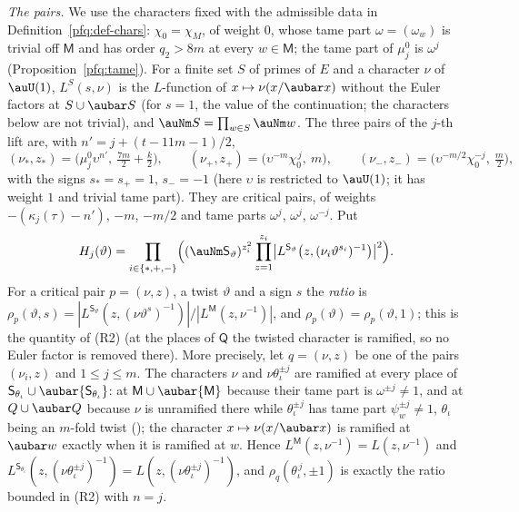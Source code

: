 \documentclass[10pt]{amsart}
\theoremstyle{definition}
\theoremstyle{remark}
\begin{document}
\emph{The pairs.} We use the characters fixed with the admissible data in
Definition~\ref{pfq:def-chars}: $\chi_0=\chi_M$, of weight $0$, whose tame part $\omega=(\omega_w)$ is
trivial off $\mathsf M$ and has order $q_2>8m$ at every $w\in\mathsf M$; the tame part of $\mu_j^0$ is
$\omega^j$ (Proposition~\ref{pfq:tame}). For a finite set $S$ of primes of $E$ and a character $\nu$ of $\auU(1)$,
$L^S(s,\nu)$ is the $L$-function of $x\mapsto\nu(x/\aubar x)$ without the Euler factors at
$S\cup\aubar S$ (for $s=1$, the value of the continuation; the characters below are not trivial),
and $\auNm S=\prod_{w\in S}\auNm w$. The three pairs of the $j$-th lift are, with
$n'=j+(t-11m-1)/2$,
\[
(\nu_\ast,z_\ast)=\bigl(\mu_j^0\upsilon^{n'},\ \tfrac{7m}2+\tfrac k2\bigr),\qquad
(\nu_+,z_+)=\bigl(\upsilon^{-m}\chi_0^{\,j},\ m\bigr),\qquad
(\nu_-,z_-)=\bigl(\upsilon^{-m/2}\chi_0^{-j},\ \tfrac m2\bigr),
\]
with the signs $s_\ast=s_+=1$, $s_-=-1$ (here $\upsilon$ is restricted to $\auU(1)$; it has weight
$1$ and trivial tame part). They are critical pairs, of weights $-(\kappa_j(\tau)-n')$, $-m$,
$-m/2$ and tame parts $\omega^j$, $\omega^j$, $\omega^{-j}$. Put
\begin{equation}\label{po:eq-H}
H_j(\vartheta)=\prod_{i\in\{\ast,+,-\}}\Bigl((\auNm\mathsf S_\vartheta)^{z_i^2}\prod_{z=1}^{z_i}
\bigl|L^{\mathsf S_\vartheta}\bigl(z,(\nu_i\vartheta^{s_i})^{-1}\bigr)\bigr|^2\Bigr).
\end{equation}
For a critical pair $p=(\nu,z)$, a twist $\vartheta$ and a sign $s$ the \emph{ratio} is
$\rho_p(\vartheta,s)=|L^{\mathsf S_\vartheta}(z,(\nu\vartheta^{s})^{-1})|/|L^{\mathsf M}(z,
\nu^{-1})|$, and $\rho_p(\vartheta)=\rho_p(\vartheta,1)$; this is the quantity of (R2) (at the
places of $\mathsf Q$ the twisted character is ramified, so no Euler factor is removed there).
More precisely, let $q=(\nu,z)$ be one of the pairs $(\nu_i,z)$ and $1\le j\le m$. The characters
$\nu$ and $\nu\theta_\iota^{\pm j}$ are ramified at every place of $\mathsf S_{\theta_\iota}\cup
\aubar{\mathsf S_{\theta_\iota}}$: at $\mathsf M\cup\aubar{\mathsf M}$ because their tame part is
$\omega^{\pm j}\ne1$, and at $Q\cup\aubar Q$ because $\nu$ is unramified there while $\theta_\iota^{\pm j}$
has tame part $\psi_w^{\pm j}\ne1$, $\theta_\iota$ being an $m$-fold twist ({\cite[\S14.3]{P46}}); the
character $x\mapsto\nu(x/\aubar x)$ is ramified at $\aubar w$ exactly when it is ramified at $w$. Hence
$L^{\mathsf M}(z,\nu^{-1})=L(z,\nu^{-1})$ and $L^{\mathsf S_{\theta_\iota}}(z,(\nu\theta_\iota^{\pm j})^{-1})=
L(z,(\nu\theta_\iota^{\pm j})^{-1})$, and $\rho_q(\theta_\iota^{\,j},\pm1)$ is exactly the ratio bounded in (R2)
with $n=j$.
\end{document}
